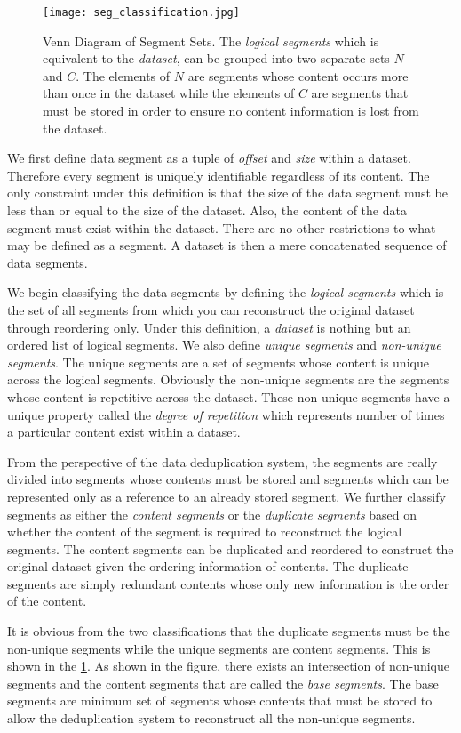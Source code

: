 \begin{figure}[!t]
\centering
\texttt{[image: seg\_classification.jpg]}
\caption{Venn Diagram of Segment Sets. The \emph{logical segments} which is equivalent to the \emph{dataset}, can be grouped into two separate sets $N$ and $C$. The elements of $N$ are segments whose content occurs more than once in the dataset while the elements of $C$ are segments that must be stored in order to ensure no content information is lost from the dataset.}
\label{seg_class}
\end{figure}

We first define data segment as a tuple of \emph{offset} and \emph{size} within a dataset. Therefore every segment is uniquely identifiable regardless of its content. The only constraint under this definition is that the size of the data segment must be less than or equal to the size of the dataset. Also, the content of the data segment must exist within the dataset. There are no other restrictions to what may be defined as a segment. A dataset is then a mere concatenated sequence of data segments.

We begin classifying the data segments by defining the \emph{logical segments} which is the set of all segments from which you can reconstruct the original dataset through reordering only. Under this definition, a \emph{dataset} is nothing but an ordered list of logical segments. We also define \emph{unique segments} and \emph{non-unique segments}. The unique segments are a set of segments whose content is unique across the logical segments. Obviously the non-unique segments are the segments whose content is repetitive across the dataset. These non-unique segments have a unique property called the \emph{degree of repetition} which represents number of  times a particular content exist within a dataset.

From the perspective of the data deduplication system, the segments are really divided into segments whose contents must be stored and segments which can be represented only as a reference to an already stored segment. We further classify segments as either the \emph{content segments} or the \emph{duplicate segments} based on whether the content of the segment is required to reconstruct the logical segments. The content segments can be duplicated and reordered to construct the original dataset given the ordering information of contents. The duplicate segments are simply redundant contents whose only new information is the order of the content.

It is obvious from the two classifications that the duplicate segments must be the non-unique segments while the unique segments are content segments. This is shown in the \figurename \ref{seg_class}. As shown in the figure, there exists an intersection of non-unique segments and the content segments that are called the \emph{base segments}. The base segments are minimum set of segments whose contents that must be stored to allow the deduplication system to reconstruct all the non-unique segments.

